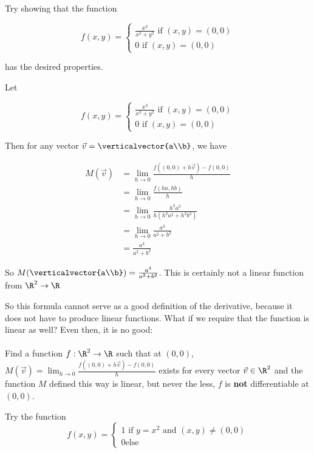 \documentclass{ximera}
\begin{document}
	\begin{hint}
		Try showing that the function 
		
		\[f(x,y) = \begin{cases} 
			\frac{x^3}{x^2+y^2} \text{ if $(x,y) = (0,0)$} \\
			0 \text{ if $(x,y) = (0,0)$}
			\end{cases}\] 
			
			has the desired properties.
	\end{hint}
	\begin{free-response}
		Let 
		
		\[f(x,y) = \begin{cases} 
			\frac{x^3}{x^2+y^2} \text{ if $(x,y) = (0,0)$} \\
			0 \text{ if $(x,y) = (0,0)$}
			\end{cases}\] 
			
		Then for any vector $\vec{v} = \verticalvector{a\\b}$, we have 
		
		\begin{align*}
			M(\vec{v}) &= \lim_{h \to 0}\frac{f((0,0)+h\vec{v}) - f(0,0)}{h}\\
							&= \lim_{h \to 0}\frac{f(ha,hb)}{h}\\
							&=\lim_{h \to 0}\frac{h^3a^3}{h(h^2a^2+h^2b^2)}\\
							&=\lim_{h \to 0}\frac{a^3}{a^2+b^2}\\
							&=\frac{a^3}{a^2+b^2}
		\end{align*}
		
		So $M(\verticalvector{a\\b}) = \frac{a^3}{a^2+b^2}$.  This is certainly not a linear function from $\R^2 \to \R$
			
	\end{free-response}
	
	So this formula cannot serve as a good definition of the derivative, because it does not have to produce linear functions.  What if we require that the function is linear as well?
	Even then, it is no good:
	\\
	\\
	Find a function $f:\R^2 \to \R$ such that at $(0,0)$, $M(\vec{v}) = \lim_{h \to 0}\frac{f((0,0)+h\vec{v}) - f(0,0)}{h}$ exists for every vector $\vec{v} \in \R^2$ and 
	the function $M$ defined this way is linear, but never the less, $f$ is \textbf{not} differentiable at $(0,0)$.
	
	\begin{hint}
		Try the function \[f(x,y) = \begin{cases}
			1 \text{ if $y=x^2$ and $(x,y) \neq (0,0)$}\\
			0 \text{else}
		\end{cases}\]
	\end{hint}
	
\end{document}
